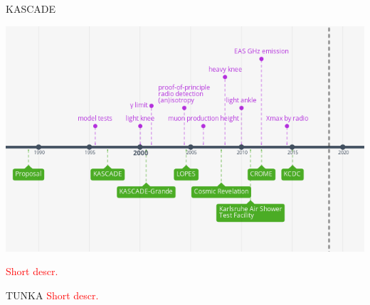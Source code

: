 \documentclass[18pt]{beamer}
\begin{document}
\begin{frame}{KASCADE}
\begin{center}
  \includegraphics[width=0.79\linewidth]{pics/timeline_kascade.png}
\end{center}
\vspace{-2\parsep}
\textcolor{red}{Short descr.}
\end{frame}

\begin{frame}{TUNKA}
\textcolor{red}{Short descr.}
\end{frame}
\end{document}
